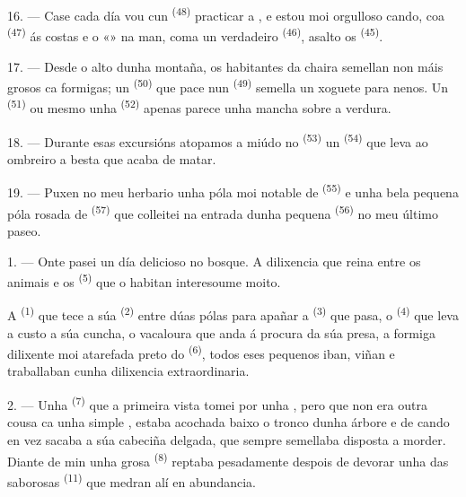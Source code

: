 \VUsaut{3.0mm}

16. --- Case cada día vou cun  \textsuperscript{(48)} practicar a
, e estou moi orgulloso cando, coa 
\textsuperscript{(47)} ás costas e o «» na man, coma un verdadeiro
 \textsuperscript{(46)}, asalto os 
\textsuperscript{(45)}.

17. --- Desde o alto dunha montaña, os habitantes da chaira semellan non máis grosos
ca formigas; un  \textsuperscript{(50)} que pace nun
 \textsuperscript{(49)} semella un xoguete para nenos. Un
 \textsuperscript{(51)} ou mesmo unha 
\textsuperscript{(52)} apenas parece unha mancha sobre a verdura.

18. --- Durante esas excursións atopamos a miúdo no 
\textsuperscript{(53)} un  \textsuperscript{(54)} que leva
ao ombreiro a besta que acaba de matar.

19. --- Puxen no meu herbario unha póla moi notable de 
\textsuperscript{(55)} e unha bela pequena póla rosada de 
\textsuperscript{(57)} que colleitei na entrada dunha pequena 
\textsuperscript{(56)} no meu último paseo.

\VUsaut{3.0mm}
\VUsaut{3.0mm}

\VUsaut{3.0mm}

1. --- Onte pasei un día delicioso no bosque. A dilixencia que reina entre os animais
e os  \textsuperscript{(5)} que o habitan interesoume moito.

A  \textsuperscript{(1)} que tece a súa 
\textsuperscript{(2)} entre dúas pólas para apañar a 
\textsuperscript{(3)} que pasa, o  \textsuperscript{(4)} que leva a
custo a súa cuncha, o vacaloura que anda á procura da súa presa, a formiga dilixente
moi atarefada preto do  \textsuperscript{(6)}, todos eses
pequenos iban, viñan e traballaban cunha dilixencia extraordinaria.

2. --- Unha  \textsuperscript{(7)} que a primeira vista tomei por unha
, pero que non era outra cousa ca unha simple , estaba
acochada baixo o tronco dunha árbore e de cando en vez sacaba a súa cabeciña delgada,
que sempre semellaba disposta a morder. Diante de min unha grosa 
\textsuperscript{(8)} reptaba pesadamente despois de devorar unha das saborosas
 \textsuperscript{(11)} que medran alí en abundancia.

